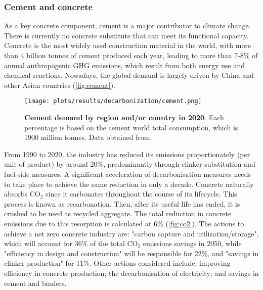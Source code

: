 \begin{enumerate}
\end{enumerate}


\subsubsection{Cement and concrete}
\label{sec:cement_and_concrete}

As a key concrete component, cement is a major contributor to climate change. There is currently no concrete substitute that can meet its functional capacity.\autocite{environment2018eco} Concrete is the most widely used construction material in the world, with more than 4 billion tonnes of cement produced each year, leading to more than 7-8\% of annual anthropogenic GHG emissions,\autocite{cement2021concrete} which result from both energy use and chemical reactions. Nowadays, the global demand is largely driven by China and other Asian countries\autocite{iea_2020} (\autoref{fig:cement}).

\begin{figure}[ht!]
  \centering
  \texttt{[image: plots/results/decarbonization/cement.png]}
  \caption[Cement demand by region and/or country in 2020]{\textbf{Cement demand by region and/or country in 2020}. Each percentage is based on the cement world total consumption, which is 1900 million tonnes. Data obtained from.\autocite{iea_2020}}
  \label{fig:cement}
\end{figure}

From 1990 to 2020, the industry has reduced its emissions proportionately (per unit of product) by around 20\%, predominantly through clinker substitution and fuel-side measures. A significant acceleration of decarbonisation measures needs to take place to achieve the same reduction in only a decade.\autocite{cement2021concrete} Concrete naturally absorbs CO$_2$ since it carbonates throughout the course of its lifecycle. This process is known as recarbonation. Then, after its useful life has ended, it is crushed to be used as recycled aggregate. The total reduction in concrete emissions due to this resorption is calculated at 6\%\autocite{aus_2022} (\autoref{fig:co2}). The actions to achieve a net zero concrete industry are: "carbon capture and utilization/storage", which will account for 36\% of the total CO$_2$ emissions savings in 2050, while "efficiency in design and construction" will be responsible for 22\%, and "savings in clinker production" for 11\%. Other actions considered include: improving efficiency in concrete production; the decarbonisation of electricity; and savings in cement and binders.

